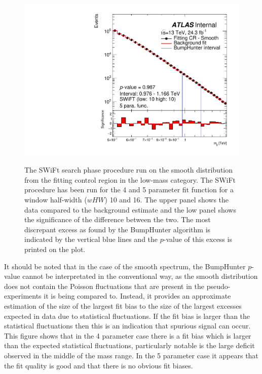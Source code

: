 \begin{figure}[!htb]
 {
  \includegraphics[width=0.45\linewidth, angle=0]{figs/Dibjet/LowMass/FitStudy/bhFit_corrFitCR_smooth_5para_low10_high10.pdf}
}
\vspace{10pt}
\caption{\label{fig:bhFit_lm_corrFitCR_smooth}
  The SWiFt search phase procedure run on the smooth distribution from the fitting control region in the low-mass category.
  The SWiFt procedure has been run for the 4 and 5 parameter fit function for a window half-width ($wHW$) 10 and 16.
  The upper panel shows the data compared to the background estimate and the low panel shows the significance of the difference between the two.
  The most discrepant excess as found by the {\sc BumpHunter} algorithm is indicated by the vertical blue lines and the \mbox{$p$-value} of this excess is printed on the plot. }
\end{figure}

It should be noted that in the case of the smooth spectrum, the {\sc BumpHunter} \mbox{$p$-value} cannot be interpretated in the conventional way,
as the smooth distribution does not contain the Poisson fluctuations that are present in the pseudo-experiments it is being compared to.
Instead, it provides an approximate estimation of the size of the largest fit bias to the size of the largest excesses expected in data due to statistical fluctuations.
If the fit bias is larger than the statistical fluctuations then this is an indication that spurious signal can occur. 
This figure shows that in the 4 parameter case there is a fit bias which is larger than the expected statistical fluctuations,
particularly notable is the large deficit observed in the middle of the mass range.
In the 5 parameter case it appears that the fit quality is good and that there is no obvious fit biases.
 
